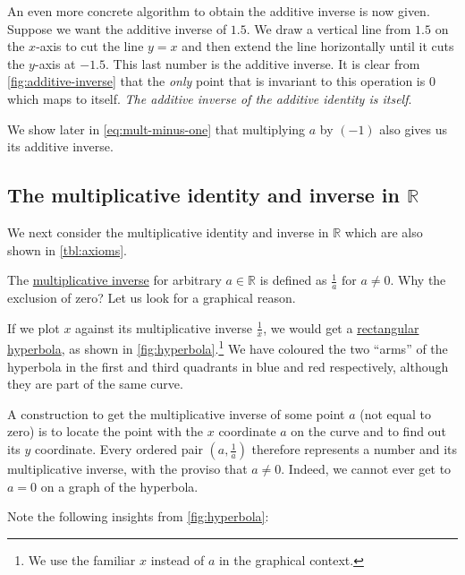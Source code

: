 \documentclass[
  a4paper,
]{article}
\begin{document}
An even more concrete algorithm to obtain the additive inverse is now
given. Suppose we want the additive inverse of \(1.5\). We draw a
vertical line from \(1.5\) on the \(x\)-axis to cut the line \(y = x\)
and then extend the line horizontally until it cuts the \(y\)-axis at
\(-1.5\). This last number is the additive inverse. It is clear from
\cref{fig:additive-inverse} that the \emph{only} point that is invariant
to this operation is \(0\) which maps to itself. \emph{The additive
inverse of the additive identity is itself}.

We show later in \cref{eq:mult-minus-one} that multiplying \(a\) by
\((-1)\) also gives us its additive inverse.

\hypertarget{the-multiplicative-identity-and-inverse-in-mathbbr}{%
\subsection{\texorpdfstring{The multiplicative identity and inverse in
\(\mathbb{R}\)}{The multiplicative identity and inverse in \textbackslash mathbb\{R\}}}\label{the-multiplicative-identity-and-inverse-in-mathbbr}}

We next consider the multiplicative identity and inverse in
\(\mathbb{R}\) which are also shown in \cref{tbl:axioms}.

The
\href{https://mathworld.wolfram.com/MultiplicativeInverse.html}{multiplicative
inverse} for arbitrary \(a \in \mathbb{R}\) is defined as
\(\frac{1}{a} \text{ for } a \ne 0\). Why the exclusion of zero? Let us
look for a graphical reason.

If we plot \(x\) against its multiplicative inverse \(\frac{1}{x}\), we
would get a \href{https://en.wikipedia.org/wiki/Hyperbola}{rectangular
hyperbola}, as shown in \cref{fig:hyperbola}.\footnote{We use the
  familiar \(x\) instead of \(a\) in the graphical context.} We have
coloured the two ``arms'' of the hyperbola in the first and third
quadrants in blue and red respectively, although they are part of the
same curve.

A construction to get the multiplicative inverse of some point \(a\)
(not equal to zero) is to locate the point with the \(x\) coordinate
\(a\) on the curve and to find out its \(y\) coordinate. Every ordered
pair \((a, \frac{1}{a})\) therefore represents a number and its
multiplicative inverse, with the proviso that \(a \ne 0\). Indeed, we
cannot ever get to \(a = 0\) on a graph of the hyperbola.

Note the following insights from \cref{fig:hyperbola}:
\end{document}
